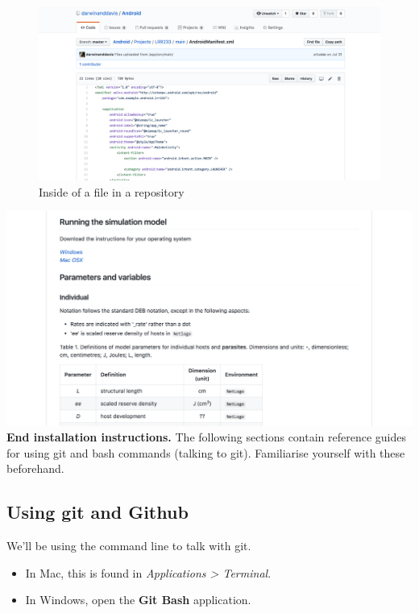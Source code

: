 \documentclass[10,portrait]{article}
\providecommand{\tightlist}{%
  \setlength{\itemsep}{0pt}\setlength{\parskip}{0pt}}
\begin{document}
\begin{figure}
\centering
\includegraphics{filepage.png}
\caption{Inside of a file in a repository}
\end{figure}

\includegraphics{readme.png}\\
\hspace*{0.333em} \textbf{End installation instructions.} The following
sections contain reference guides for using git and bash commands
(talking to git). Familiarise yourself with these beforehand.

\newpage     

\subsection{Using git and Github}\label{using-git-and-github}

We'll be using the command line to talk with git.

\begin{itemize}
\tightlist
\item
  In Mac, this is found in \emph{Applications \textgreater{}
  Terminal}.\\
\item
  In Windows, open the \textbf{Git Bash} application.
\end{itemize}
\end{document}
